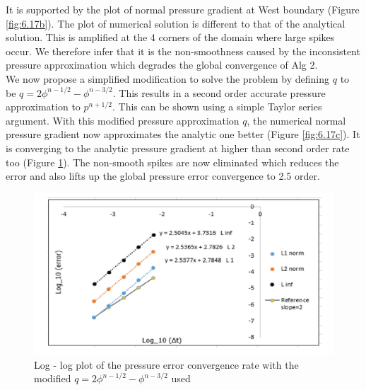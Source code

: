 It is supported by the plot of normal pressure gradient at West boundary (Figure \ref{fig:6.17b}). The plot of numerical solution is different to that of the analytical solution. This is amplified at the 4 corners of the domain where large spikes occur. We therefore infer that it is the non-smoothness caused by the inconsistent pressure approximation which degrades the global convergence of Alg 2.\\

We now propose a simplified modification to solve the problem by defining $q$ to be $q = 2\phi^{n-1/2} - \phi^{n-3/2}$. This results in a second order accurate pressure approximation to $p^{n+1/2}$. This can be shown using a simple Taylor series argument. With this modified pressure approximation $q$, the numerical normal pressure gradient now approximates the analytic one better (Figure \ref{fig:6.17c}). It is converging to the analytic pressure gradient at higher than second order rate too (Figure \ref{fig:6.16}). The non-smooth spikes are now eliminated which reduces the error and also lifts up the global pressure error convergence to 2.5 order.

\begin{figure}[H]
	\centering
	\includegraphics[width=4.5in]{figures/Pm1b2_unf1_np_P_rate.jpg}
	\caption{Log - log plot of the pressure error convergence rate with the modified $q = 2\phi^{n-1/2} - \phi^{n-3/2}$ used }\label{fig:6.16}
\end{figure}

